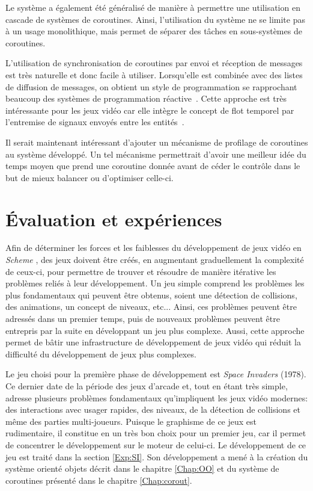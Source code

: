 \documentclass[12pt,twoside,letterpaper,francais]{book}
\newcommand{\si}{{\textit{Space Invaders }}}
\newcommand{\Schemelang}{{\textit{Scheme }}}
\begin{document}
Le système a également été généralisé de manière à permettre une
utilisation en cascade de systèmes de coroutines. Ainsi, l'utilisation
du système ne se limite pas à un usage monolithique, mais permet de
séparer des tâches en sous-systèmes de coroutines.

L'utilisation de synchronisation de coroutines par envoi et réception
de messages est très naturelle et donc facile à utiliser. Lorsqu'elle
est combinée avec des listes de diffusion de messages, on obtient un
style de programmation se rapprochant beaucoup des systèmes de
programmation réactive~\cite{FRP}. Cette approche est très
intéressante pour les jeux vidéo car elle intègre le concept de flot
temporel par l'entremise de signaux envoyés entre les
entités~\cite{yampa}.

Il serait maintenant intéressant d'ajouter un mécanisme de profilage
de coroutines au système développé. Un tel mécanisme permettrait
d'avoir une meilleur idée du temps moyen que prend une coroutine
donnée avant de céder le contrôle dans le but de mieux balancer ou
d'optimiser celle-ci.

\clearpage

\chapter{Évaluation et expériences}\label{Chap:exp}
Afin de déterminer les forces et les faiblesses du développement de
jeux vidéo en \Schemelang, des jeux doivent être créés, en augmentant
graduellement la complexité de ceux-ci, pour permettre de trouver et
résoudre de manière itérative les problèmes reliés à leur
développement. Un jeu simple comprend les problèmes les plus
fondamentaux qui peuvent être obtenus, soient une détection de
collisions, des animations, un concept de niveaux, etc... Ainsi, ces
problèmes peuvent être adressés dans un premier temps, puis de
nouveaux problèmes peuvent être entrepris par la suite en développant
un jeu plus complexe. Aussi, cette approche permet de bâtir une
infrastructure de développement de jeux vidéo qui réduit la difficulté
du développement de jeux plus complexes.

Le jeu choisi pour la première phase de développement est \si
(1978). Ce dernier date de la période des jeux d'arcade et, tout en
étant très simple, adresse plusieurs problèmes fondamentaux
qu'impliquent les jeux vidéo modernes: des interactions avec usager
rapides, des niveaux, de la détection de collisions et même des
parties multi-joueurs. Puisque le graphisme de ce jeux est
rudimentaire, il constitue en un très bon choix pour un premier jeu,
car il permet de concentrer le développement sur le moteur de
celui-ci. Le développement de ce jeu est traité dans la section
\ref{Exp:SI}. Son développement a mené à la création du système
orienté objets décrit dans le chapitre \ref{Chap:OO} et du système de
coroutines présenté dans le chapitre \ref{Chap:corout}.
\end{document}
